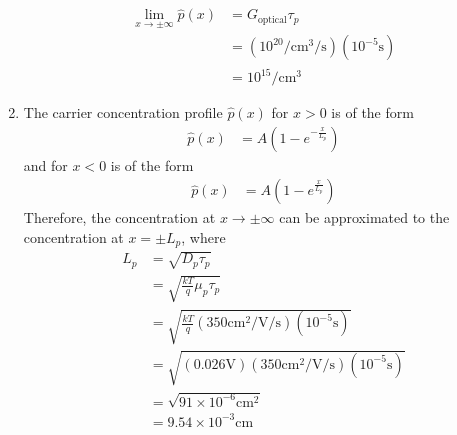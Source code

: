 \documentclass[fleqn, a4paper, 11pt, oneside]{amsart}
\theoremstyle{definition}
\theoremstyle{theorem}
\begin{document}
\begin{solution}
\begin{enumerate}[leftmargin=*]
\begin{align*}
				\lim\limits_{x \to \pm\infty} \hat{p}(x) & = G_{\text{optical}} \tau_p                                                                         \\
                                                                         & = \left( 10^{20} \si{\per\centi\metre\cubed\per\second} \right) \left( 10^{-5} \si{\second} \right) \\
                                                                         & = 10^{15} \si{\per\centi\metre\cubed}
			\end{align*}
		\item
			The carrier concentration profile $\hat{p}(x)$ for $x > 0$ is of the form
			\begin{align*}
				\hat{p}(x) & = A \left( 1 - e^{-\frac{x}{L_p}} \right)
			\end{align*}
			and for $x < 0$ is of the form
			\begin{align*}
				\hat{p}(x) & = A \left( 1 - e^{\frac{x}{L_p}} \right)
			\end{align*}
			Therefore, the concentration at $x \to \pm\infty$ can be approximated to the concentration at $x = \pm L_p$, where
			\begin{align*}
				L_p & = \sqrt{D_p \tau_p}                                                                                                                           \\
                                    & = \sqrt{\frac{k T}{q} \mu_p \tau_p}                                                                                                           \\
                                    & = \sqrt{\frac{k T}{q} \left( 350 \si{\centi\metre\squared\per\volt\per\second} \right) \left( 10^{-5} \si{\second} \right)}                   \\
                                    & = \sqrt{\left( 0.026 \si{\volt} \right) \left( 350 \si{\centi\metre\squared\per\volt\per\second} \right) \left( 10^{-5} \si{\second} \right)} \\
                                    & = \sqrt{91 \times 10^{-6} \si{\centi\metre\squared}}                                                                                          \\
                                    & = 9.54 \times 10^{-3} \si{\centi\metre}
			\end{align*}
	\end{enumerate}
\end{solution}
\end{document}
